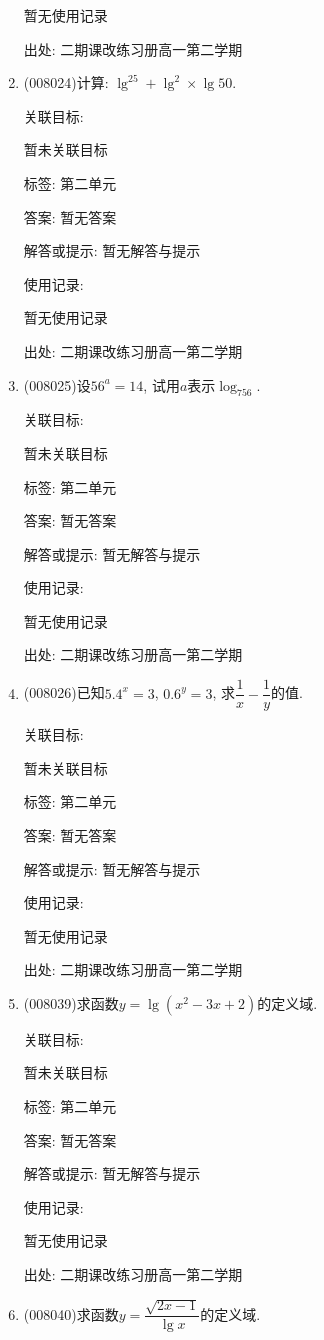 \documentclass[10pt,a4paper]{article}
\begin{document}
\begin{enumerate}[1.]
暂无使用记录


出处: 二期课改练习册高一第二学期
\item { (008024)}计算: $\lg ^25+\lg ^2\times \lg 50$.


关联目标:

暂未关联目标



标签: 第二单元

答案: 暂无答案

解答或提示: 暂无解答与提示

使用记录:

暂无使用记录


出处: 二期课改练习册高一第二学期
\item { (008025)}设$56^a=14$, 试用$a$表示$\log _756$.


关联目标:

暂未关联目标



标签: 第二单元

答案: 暂无答案

解答或提示: 暂无解答与提示

使用记录:

暂无使用记录


出处: 二期课改练习册高一第二学期
\item { (008026)}已知$5.4^x=3$, $0.6^y=3$, 求$\dfrac 1x-\dfrac 1y$的值.


关联目标:

暂未关联目标



标签: 第二单元

答案: 暂无答案

解答或提示: 暂无解答与提示

使用记录:

暂无使用记录


出处: 二期课改练习册高一第二学期
\item { (008039)}求函数$y=\lg (x^2-3x+2)$的定义域.


关联目标:

暂未关联目标



标签: 第二单元

答案: 暂无答案

解答或提示: 暂无解答与提示

使用记录:

暂无使用记录


出处: 二期课改练习册高一第二学期
\item { (008040)}求函数$y=\dfrac{\sqrt {2x-1}}{\lg x}$的定义域.



\end{enumerate}
\end{document}
